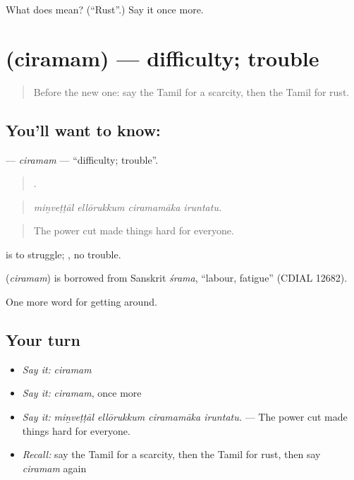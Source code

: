 \begin{tcolorbox}[breakable,colback=teal!4,colframe=teal!35!black,title={Before you move on}]
What does  mean? (\textquotedblleft{}Rust\textquotedblright{}.) Say it once more.
\end{tcolorbox}
\section[\texorpdfstring{\ta{சிரமம்} (ciramam)}{சிரமம் (ciramam)}]{ (ciramam) — difficulty; trouble}

\label{lesson:TA-C445-ciramam}



\begin{quote}
Before the new one: say the Tamil for a scarcity, then the Tamil for rust.
\end{quote}

\subsection*{You'll want to know: }
\textbf{} — \emph{ciramam} — \textquotedblleft{}difficulty; trouble\textquotedblright{}.

\begin{quote}
   .
\end{quote}

\begin{quote}
\emph{miṉveṭṭāl ellōrukkum ciramamāka iruntatu.}
\end{quote}

\begin{quote}
The power cut made things hard for everyone.
\end{quote}

 is to struggle;  , no trouble.

\begin{cousinweb}
\textbf{} (\emph{ciramam}) is borrowed from Sanskrit \emph{śrama}, \textquotedblleft{}labour, fatigue\textquotedblright{} (CDIAL 12682).
\end{cousinweb}

\begin{grammarlens}[title={What you've built}]
One more word for getting around.
\end{grammarlens}

\subsection*{Your turn}
\begin{itemize}
\raggedright
  \item \emph{Say it:} \emph{ciramam}
  \item \emph{Say it:} \emph{ciramam}, once more
  \item \emph{Say it:} \emph{miṉveṭṭāl ellōrukkum ciramamāka iruntatu.} — The power cut made things hard for everyone.
  \item \emph{Recall:} say the Tamil for a scarcity, then the Tamil for rust, then say \emph{ciramam} again
\end{itemize}


